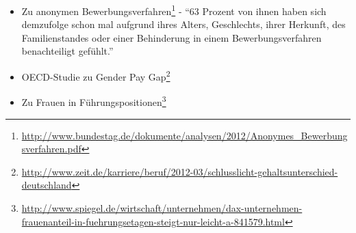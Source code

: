 \begin{itemize}
\item
  Zu anonymen Bewerbungsverfahren\footnote{\url{http://www.bundestag.de/dokumente/analysen/2012/Anonymes\_Bewerbungsverfahren.pdf}} - ``63 Prozent von ihnen haben sich demzufolge schon mal aufgrund ihres Alters, Geschlechts, ihrer Herkunft, des Familienstandes oder einer Behinderung in einem Bewerbungsverfahren benachteiligt gefühlt.''
\item
  OECD-Studie zu Gender Pay Gap\footnote{\url{http://www.zeit.de/karriere/beruf/2012-03/schlusslicht-gehaltsunterschied-deutschland}}
\item
  Zu Frauen in Führungspositionen\footnote{\url{http://www.spiegel.de/wirtschaft/unternehmen/dax-unternehmen-frauenanteil-in-fuehrungsetagen-steigt-nur-leicht-a-841579.html}}
\end{itemize}
